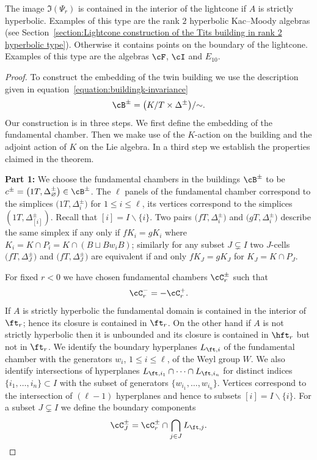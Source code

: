 \begin{Remark} The image $\Im(\Psi_r)$ is contained in the interior of the lightcone if $A$ is strictly hyperbolic. Examples of this type are the rank $2$ hyperbolic Kac--Moody algebras (see Section~\ref{section:Lightcone construction of the Tits building in rank 2 hyperbolic type}). Otherwise it contains points on the boundary of the lightcone. Examples of this type are the algebras $\cF$, $\cI$ and $E_{10}$.
\end{Remark}

\begin{proof}To construct the embedding of the twin building we use the description given in equation~\eqref{equation:buildingk-invariance}
\[\cB^\pm=\big(K/T\times \Delta^{\pm}\big)/{\sim}. \]
Our construction is in three steps. We first define the embedding of the fundamental chamber. Then we make use of the $K$-action on the building and the adjoint action of $K$ on the Lie algebra. In a third step we establish the properties claimed in the theorem.

{\bf Part 1:} We choose the fundamental chambers in the buildings $\cB^\pm$ to be $c^\pm =\big(1 T, \Delta_\varnothing^\pm\big)\in \cB^\pm$. The $\ell$ panels of the fundamental chamber correspond to the simplices $\big(1 T, \Delta_i^\pm\big)$ for $1\leq i \leq \ell$, its vertices correspond to the simplices $(1 T, \Delta_{[i]}^\pm)$. Recall that $[i] = I\backslash\{i\}$. Two pairs $\big(f T, \Delta_i^\pm\big)$ and $\big(g T, \Delta_i^\pm\big)$ describe the same simplex if any only if $fK_i=gK_i$ where $K_i=K\cap P_i=K\cap (B\sqcup Bw_iB)$; similarly for any subset $J\subsetneq I$ two $J$-cells $\big(f T, \Delta_{J}^\pm\big)$ and $\big(f T, \Delta_{J}^\pm\big)$ are equivalent if and only $f K_J=g K_J$ for $K_J=K\cap P_J$.

For fixed $r<0$ we have chosen fundamental chambers $\cC_r^\pm$ such that
\begin{gather}\label{equation:opposite_fundamental_domain}
\cC_r^- = - \cC_r^+.
\end{gather}
 If $A$ is strictly hyperbolic the fundamental domain is contained in the interior of $\ft_r$; hence its closure is contained in $\ft_r$. On the other hand if $A$ is not strictly hyperbolic then it is unbounded and its closure is contained in $\hft_r$ but not in $\ft_r$.
 We identify the boundary hyperplanes $L_{\ft,i}$ of the fundamental chamber with the generators $w_i$, $1\leq i\leq \ell$, of the Weyl group $W$. We also identify intersections of hyperplanes $L_{\ft,i_1}\cap \dots \cap L_{\ft,i_n}$ for distinct indices $\{i_1, \dots, i_n\}\subset I$ with the subset of generators $\{w_{i_1}, \dots, w_{i_n}\}$. Vertices correspond to the intersection of $(\ell-1)$ hyperplanes and hence to subsets $[i] = I\backslash\{i\}$. For a subset $J\subsetneq I$ we define the boundary components \[\cC_J^\pm=\cC_r^\pm\cap\bigcap_{j\in J} L_{\ft, j}.\]


\end{proof}
